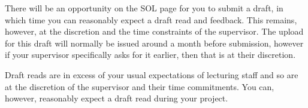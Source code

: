 There will be an opportunity on the SOL page for you to submit a draft, in which time you can reasonably expect a draft read and feedback. This remains, however, at the discretion and the time constraints of the supervisor. The upload for this draft will normally be issued around a month before submission, however if your supervisor specifically asks for it earlier, then that is at their discretion. 

\begin{tcolorbox}
    Draft reads are in excess of your usual expectations of lecturing staff and so are at the discretion of the supervisor and their time commitments. You can, however, reasonably expect a draft read during your project.
\end{tcolorbox}